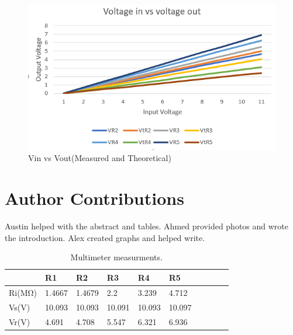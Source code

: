 \documentclass[10pt,twocolumn]{article}
\begin{document}
\begin{figure}
	\centering
	\includegraphics[width=.9\linewidth]{figures/Vin vs Vout.PNG}
	\caption{Vin vs Vout(Measured and Theoretical)}
	\label{fig:vin/out}
\end{figure}

\section{Author Contributions}

Austin helped with the abstract and tables. Ahmed provided photos and wrote the introduction. Alex created graphs and helped write.


 
\begin{table}
	\begin{tabularx}{1\linewidth}{ lXXXXX|cXXX }
		\hline
		 & \textbf{R1} & \textbf{R2} & \textbf{R3} & \textbf{R4} & \textbf{R5}\\
		\hline
		Ri(MΩ) & 1.4667 & 1.4679 & 2.2 & 3.239 & 4.712 \\
		\cline{1-6}
		Vs(V) & 10.093 & 10.093 & 10.091 & 10.093 & 10.097 \\
		\cline{1-6}
		Vr(V) & 4.691 & 4.708 & 5.547 & 6.321 & 6.936 \\
		\hline
	\end{tabularx}
	\caption{Multimeter measurments.}
	\label{tab:Tab1}
\end{table}
\end{document}
